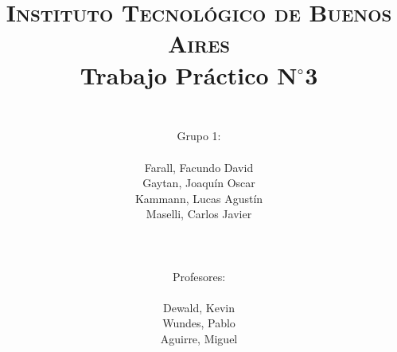 




	\title{
		\normalfont \normalsize \textsc{Instituto Tecnol\'ogico de Buenos Aires} \\ [25pt]
		\huge Trabajo Pr\'actico N$^{\circ}$3 \\
		\author{
			\\Grupo 1:\\\\Farall, Facundo David\\Gaytan, Joaqu\'in Oscar\\Kammann, Lucas Agust\'in\\Maselli, Carlos Javier\\ \\ \\ \\
			Profesores: \\\\ Dewald, Kevin\\Wundes, Pablo\\Aguirre, Miguel \\ \\ 
		}
	}
	\maketitle
	\newpage

	\tableofcontents

	\newpage
	
	\newpage
	
	\newpage
	

